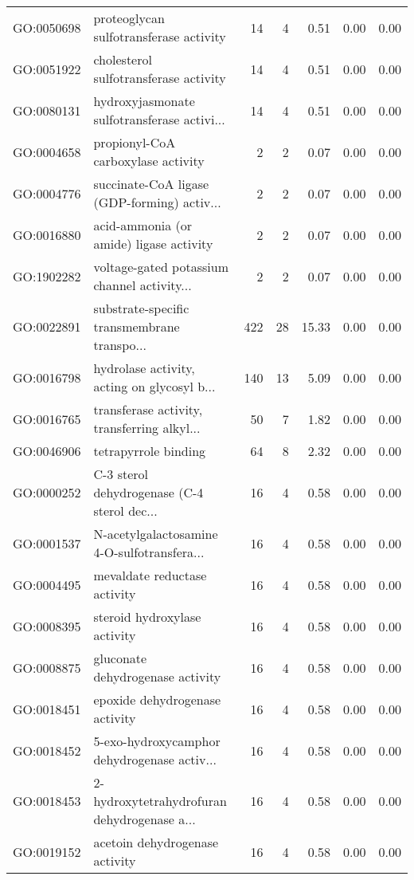 \begin{table}[ht]
\begin{tabular}{llrrrrr}
  GO:0050698 & proteoglycan sulfotransferase activity &  14 &   4 & 0.51 & 0.00 & 0.00 \\ 
  GO:0051922 & cholesterol sulfotransferase activity &  14 &   4 & 0.51 & 0.00 & 0.00 \\ 
  GO:0080131 & hydroxyjasmonate sulfotransferase activi... &  14 &   4 & 0.51 & 0.00 & 0.00 \\ 
  GO:0004658 & propionyl-CoA carboxylase activity &   2 &   2 & 0.07 & 0.00 & 0.00 \\ 
  GO:0004776 & succinate-CoA ligase (GDP-forming) activ... &   2 &   2 & 0.07 & 0.00 & 0.00 \\ 
  GO:0016880 & acid-ammonia (or amide) ligase activity &   2 &   2 & 0.07 & 0.00 & 0.00 \\ 
  GO:1902282 & voltage-gated potassium channel activity... &   2 &   2 & 0.07 & 0.00 & 0.00 \\ 
  GO:0022891 & substrate-specific transmembrane transpo... & 422 &  28 & 15.33 & 0.00 & 0.00 \\ 
  GO:0016798 & hydrolase activity, acting on glycosyl b... & 140 &  13 & 5.09 & 0.00 & 0.00 \\ 
  GO:0016765 & transferase activity, transferring alkyl... &  50 &   7 & 1.82 & 0.00 & 0.00 \\ 
  GO:0046906 & tetrapyrrole binding &  64 &   8 & 2.32 & 0.00 & 0.00 \\ 
  GO:0000252 & C-3 sterol dehydrogenase (C-4 sterol dec... &  16 &   4 & 0.58 & 0.00 & 0.00 \\ 
  GO:0001537 & N-acetylgalactosamine 4-O-sulfotransfera... &  16 &   4 & 0.58 & 0.00 & 0.00 \\ 
  GO:0004495 & mevaldate reductase activity &  16 &   4 & 0.58 & 0.00 & 0.00 \\ 
  GO:0008395 & steroid hydroxylase activity &  16 &   4 & 0.58 & 0.00 & 0.00 \\ 
  GO:0008875 & gluconate dehydrogenase activity &  16 &   4 & 0.58 & 0.00 & 0.00 \\ 
  GO:0018451 & epoxide dehydrogenase activity &  16 &   4 & 0.58 & 0.00 & 0.00 \\ 
  GO:0018452 & 5-exo-hydroxycamphor dehydrogenase activ... &  16 &   4 & 0.58 & 0.00 & 0.00 \\ 
  GO:0018453 & 2-hydroxytetrahydrofuran dehydrogenase a... &  16 &   4 & 0.58 & 0.00 & 0.00 \\ 
  GO:0019152 & acetoin dehydrogenase activity &  16 &   4 & 0.58 & 0.00 & 0.00 \\ 

\end{tabular}
\end{table}
